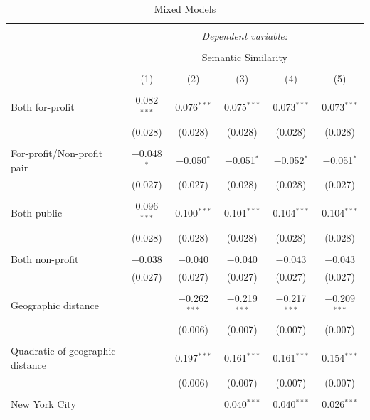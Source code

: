 \documentclass[
  12pt,
]{article}
\begin{document}
\begin{table}[!htbp] \centering 
  \caption{Mixed Models} 
  \label{} 
\tiny 
\begin{tabular}{@{\extracolsep{0pt}}lccccc} 
\\[-1.8ex]\hline 
\hline \\[-1.8ex] 
 & \multicolumn{5}{c}{\textit{Dependent variable:}} \\ 
\cline{2-6} 
\\[-1.8ex] & \multicolumn{5}{c}{Semantic Similarity} \\ 
\\[-1.8ex] & (1) & (2) & (3) & (4) & (5)\\ 
\hline \\[-1.8ex] 
 Both for-profit & 0.082$^{***}$ & 0.076$^{***}$ & 0.075$^{***}$ & 0.073$^{***}$ & 0.073$^{***}$ \\ 
  & (0.028) & (0.028) & (0.028) & (0.028) & (0.028) \\ 
  & & & & & \\ 
 For-profit/Non-profit pair & $-$0.048$^{*}$ & $-$0.050$^{*}$ & $-$0.051$^{*}$ & $-$0.052$^{*}$ & $-$0.051$^{*}$ \\ 
  & (0.027) & (0.027) & (0.028) & (0.028) & (0.027) \\ 
  & & & & & \\ 
 Both public & 0.096$^{***}$ & 0.100$^{***}$ & 0.101$^{***}$ & 0.104$^{***}$ & 0.104$^{***}$ \\ 
  & (0.028) & (0.028) & (0.028) & (0.028) & (0.028) \\ 
  & & & & & \\ 
 Both non-profit & $-$0.038 & $-$0.040 & $-$0.040 & $-$0.043 & $-$0.043 \\ 
  & (0.027) & (0.027) & (0.027) & (0.027) & (0.027) \\ 
  & & & & & \\ 
 Geographic distance &  & $-$0.262$^{***}$ & $-$0.219$^{***}$ & $-$0.217$^{***}$ & $-$0.209$^{***}$ \\ 
  &  & (0.006) & (0.007) & (0.007) & (0.007) \\ 
  & & & & & \\ 
 Quadratic of geographic distance &  & 0.197$^{***}$ & 0.161$^{***}$ & 0.161$^{***}$ & 0.154$^{***}$ \\ 
  &  & (0.006) & (0.007) & (0.007) & (0.007) \\ 
  & & & & & \\ 
 New York City &  &  & 0.040$^{***}$ & 0.040$^{***}$ & 0.026$^{***}$ \\ 

\end{tabular}
\end{table}
\end{document}
